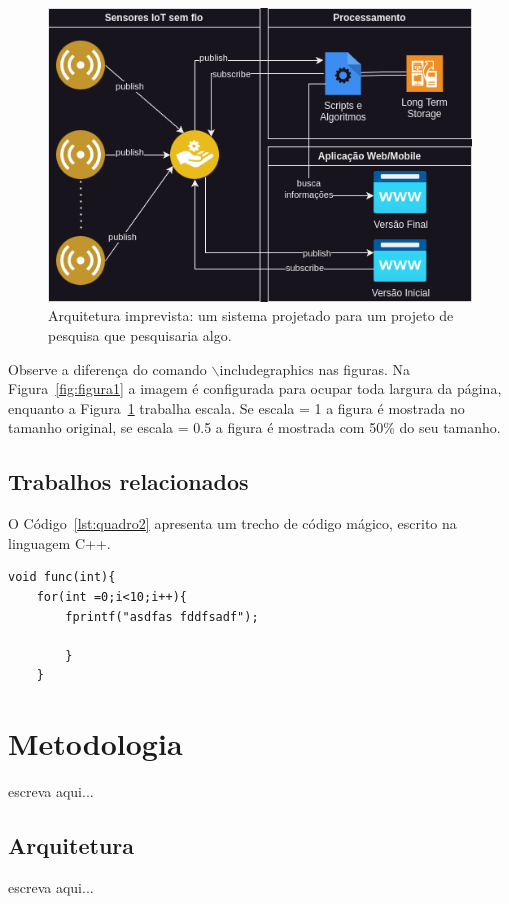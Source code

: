 \begin{figure}[htb]
	\centering
	\caption{\label{fig:figura2} Arquitetura imprevista: um sistema projetado para um projeto de pesquisa que pesquisaria algo.}
	\includegraphics[scale=0.5]{imgs/arquitetura.png}
\end{figure}

Observe a diferença do comando $\backslash$includegraphics nas figuras. Na Figura~\ref{fig:figura1} a imagem é configurada para ocupar toda largura da página, enquanto a Figura~\ref{fig:figura2} trabalha escala. Se escala = 1 a figura é mostrada no tamanho original, se escala = 0.5 a figura é mostrada com 50\% do seu tamanho. 

\section{Trabalhos relacionados}

O Código~\ref{lst:quadro2} apresenta um trecho de código mágico, escrito na linguagem C++.

\begin{lstlisting}[caption={Exemplo de laço},label={lst:quadro2}]
	void func(int){
	for(int =0;i<10;i++){
		fprintf("asdfas fddfsadf");
	
		}
	}
\end{lstlisting}


\chapter{Metodologia}
escreva aqui...

\section{Arquitetura}
escreva aqui...

